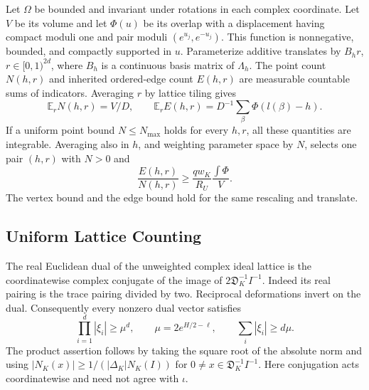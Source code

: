 Let $\Omega$ be bounded and invariant under rotations in each complex
coordinate. Let $V$ be its volume and let $\Phi(u)$ be its overlap with
a displacement having compact moduli one and pair moduli $(e^{u_j},e^{-u_j})$.
This function is nonnegative, bounded, and compactly supported in $u$.
Parameterize additive translates by $B_hr$, $r\in[0,1)^{2d}$, where
$B_h$ is a continuous basis matrix of $\Lambda_h$. The point count $N(h,r)$
and inherited ordered-edge count $E(h,r)$ are measurable countable sums
of indicators. Averaging $r$ by lattice tiling gives
\[
 \mathbb E_r N(h,r)=V/D,\qquad
 \mathbb E_r E(h,r)=D^{-1}\sum_\beta\Phi(l(\beta)-h).
\]
If a uniform point bound $N\le N_{\max}$ holds for every $h,r$, all these
quantities are integrable. Averaging also in $h$, and weighting parameter
space by $N$, selects one pair $(h,r)$ with $N>0$ and
\begin{equation}\label{geo:joint-average}
 \frac{E(h,r)}{N(h,r)}\ge
 \frac{q w_K}{R_U}\frac{\int\Phi}{V}.
\end{equation}
The vertex bound and the edge bound hold for the same rescaling and
translate.

\subsection{Uniform Lattice Counting}

The real Euclidean dual of the unweighted complex ideal lattice is the
coordinatewise complex conjugate of the image of
$2\mathfrak D_K^{-1}I^{-1}$. Indeed its real pairing is the trace pairing
divided by two. Reciprocal deformations invert on the dual. Consequently
every nonzero dual vector satisfies
\begin{equation}\label{geo:dual-product}
 \prod_{i=1}^d|\xi_i|\ge\mu^d,
 \qquad \mu=2e^{H/2-\ell},\qquad
 \sum_i|\xi_i|\ge d\mu.
\end{equation}
The product assertion follows by taking the square root of the absolute
norm and using $|N_K(x)|\ge1/(|\Delta_K|N_K(I))$ for
$0\ne x\in\mathfrak D_K^{-1}I^{-1}$.
Here conjugation acts coordinatewise and need not agree with $\iota$.

